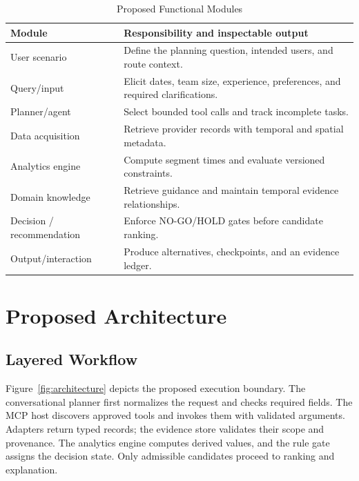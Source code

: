 \documentclass[conference]{IEEEtran}
\begin{document}
\begin{table}[t]
\caption{Proposed Functional Modules}
\label{tab:modules}
\centering\footnotesize
\begin{tabular}{@{}p{}p{}@{}}
\toprule
Module & Responsibility and inspectable output\\
\midrule
User scenario & Define the planning question, intended users, and route context.\\
Query/input & Elicit dates, team size, experience, preferences, and required clarifications.\\
Planner/agent & Select bounded tool calls and track incomplete tasks.\\
Data acquisition & Retrieve provider records with temporal and spatial metadata.\\
Analytics engine & Compute segment times and evaluate versioned constraints.\\
Domain knowledge & Retrieve guidance and maintain temporal evidence relationships.\\
Decision / recommendation & Enforce NO-GO/HOLD gates before candidate ranking.\\
Output/interaction & Produce alternatives, checkpoints, and an evidence ledger.\\
\bottomrule
\end{tabular}
\end{table}

\section{Proposed Architecture}
\subsection{Layered Workflow}
Figure~\ref{fig:architecture} depicts the proposed execution boundary. The conversational planner first normalizes the request and checks required fields. The MCP host discovers approved tools and invokes them with validated arguments. Adapters return typed records; the evidence store validates their scope and provenance. The analytics engine computes derived values, and the rule gate assigns the decision state. Only admissible candidates proceed to ranking and explanation.
\end{document}

